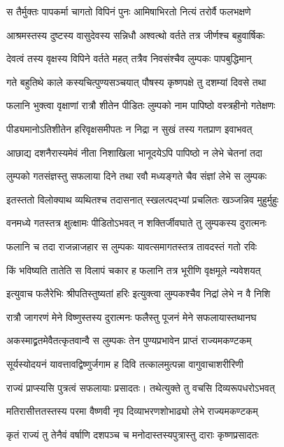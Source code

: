 \twolineshloka
{स तैर्मुक्तः पापकर्मा चागतो विपिनं पुनः}
{आमिषाभिरतो नित्यं तरोर्वै फलभक्षणे}%

\twolineshloka
{आश्रमस्तस्य दुष्टस्य वासुदेवस्य सन्निधौ}
{अश्वत्थो वर्तते तत्र जीर्णश्च बहुवार्षिकः}%

\twolineshloka
{देवत्वं तस्य वृक्षस्य विपिने वर्तते महत्}
{तत्रैव निवसंश्चैव लुम्पकः पापबुद्धिमान्}%

\twolineshloka
{गते बहुतिथे काले कस्यचित्पुण्यसञ्चयात्}
{पौषस्य कृष्णपक्षे तु दशम्यां दिवसे तथा}%

\twolineshloka
{फलानि भुक्त्वा वृक्षाणां रात्रौ शीतेन पीडितः}
{लुम्पको नाम पापिष्ठो वस्त्रहीनो गतेक्षणः}%

\twolineshloka
{पीड्यमानोऽतिशीतेन हरिवृक्षसमीपतः}
{न निद्रा न सुखं तस्य गतप्राण इवाभवत्}%

\twolineshloka
{आछाद्य दशनैरास्यमेवं नीता निशाखिला}
{भानूदयेऽपि पापिष्ठो न लेभे चेतनां तदा}%

\twolineshloka
{लुम्पको गतसंज्ञस्तु सफलाया दिने तथा}
{रवौ मध्यङ्गते चैव संज्ञां लेभे स लुम्पकः}%

\twolineshloka
{इतस्ततो विलोक्याथ व्यथितश्च तदासनात्}
{स्खलत्पद्भ्यां प्रचलितः खञ्जन्निव मुहुर्मुहुः}%

\twolineshloka
{वनमध्ये गतस्तत्र क्षुत्क्षामः पीडितोऽभवत्}
{न शक्तिर्जीवघाते तु लुम्पकस्य दुरात्मनः}%

\twolineshloka
{फलानि च तदा राजन्नाजहार स लुम्पकः}
{यावत्समागतस्तत्र तावदस्तं गतो रविः}%

\twolineshloka
{किं भविष्यति तातेति स विलापं चकार ह}
{फलानि तत्र भूरीणि वृक्षमूले न्यवेशयत्}%

\twolineshloka
{इत्युवाच फलैरेभिः श्रीपतिस्तुष्यतां हरिः}
{इत्युक्त्वा लुम्पकश्चैव निद्रां लेभे न वै निशि}%

\twolineshloka
{रात्रौ जागरणं मेने विष्णुस्तस्य दुरात्मनः}
{फलैस्तु पूजनं मेने सफलायास्तथानघ}%

\twolineshloka
{अकस्माद्व्रतमेवैतत्कृतवान्वै  स लुम्पकः}
{तेन पुण्यप्रभावेन प्राप्तं राज्यमकण्टकम्}%

\twolineshloka
{सूर्यस्योदयनं यावत्तावद्विष्णुर्जगाम ह}
{दिवि तत्कालमुत्पन्ना वागुवाचाशरीरिणी}%

\twolineshloka
{राज्यं प्राप्स्यसि पुत्रत्वं सफलायाः प्रसादतः।}
{तथेत्युक्ते तु वचसि दिव्यरूपधरोऽभवत्}%

\twolineshloka
{मतिरासीत्ततस्तस्य परमा वैष्णवी नृप}
{दिव्याभरणशोभाढ्यो लेभे राज्यमकण्टकम्}%

\twolineshloka
{कृतं राज्यं तु तेनैवं वर्षाणि दशपञ्च च}
{मनोदास्तस्यपुत्रास्तु दाराः कृष्णप्रसादतः}%

